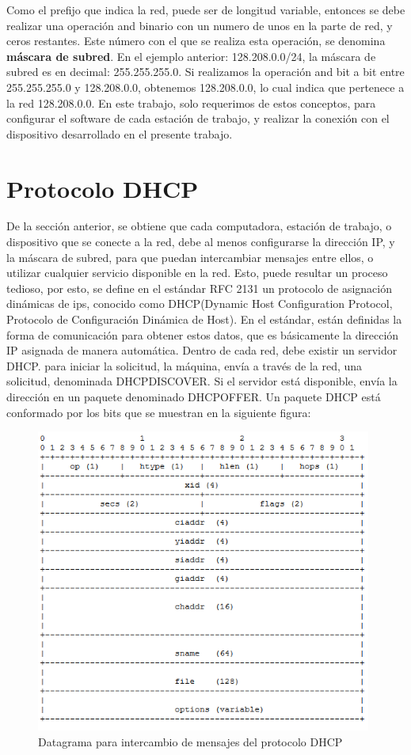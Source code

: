 Como el prefijo que indica la red, puede ser de longitud variable, entonces se debe realizar una operación and binario con un numero de unos en la parte de red, y ceros restantes. Este número con el que se realiza esta operación, se denomina \textbf{máscara de subred}. En el ejemplo anterior: 128.208.0.0/24, la máscara de subred es en decimal: 255.255.255.0. Si realizamos la operación and bit a bit entre 255.255.255.0 y 128.208.0.0, obtenemos 128.208.0.0, lo cual indica que pertenece a la red 128.208.0.0. En este trabajo, solo requerimos de estos conceptos, para configurar el software de cada estación de trabajo, y realizar la conexión con el dispositivo desarrollado en el presente trabajo.     
 
\section{Protocolo DHCP} 

De la sección anterior, se obtiene que cada computadora, estación de trabajo, o dispositivo que se conecte a la red, debe al menos configurarse la dirección IP, y la máscara de subred, para que puedan intercambiar mensajes entre ellos, o utilizar cualquier servicio disponible en la red. Esto, puede resultar un proceso tedioso, por esto, se define en el estándar RFC 2131\cite{RFCDHCP} un protocolo de asignación dinámicas de ips, conocido como DHCP(Dynamic Host Configuration Protocol, Protocolo de Configuración Dinámica de Host). En el estándar, están definidas la forma de comunicación para obtener estos datos, que es básicamente la dirección IP asignada de manera automática.  
Dentro de cada red, debe existir un servidor DHCP. para iniciar la solicitud, la máquina, envía a través de la red, una solicitud, denominada DHCPDISCOVER. Si el servidor está disponible, envía la dirección en un paquete denominado DHCPOFFER. 
Un paquete DHCP está conformado por los bits que se muestran en la siguiente figura: 
\begin{figure}[ht]
	\includegraphics[width=\textwidth,height=10cm]{paqdhcp}
	\caption{Datagrama para intercambio de mensajes del protocolo DHCP}
	\label{fig:pqdhcp}
\end{figure} 

